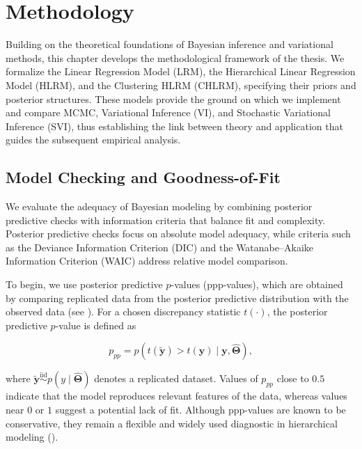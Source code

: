 \chapter{Methodology}

Building on the theoretical foundations of Bayesian inference and variational methods, this chapter develops the methodological framework of the thesis. We formalize the Linear Regression Model (LRM), the Hierarchical Linear Regression Model (HLRM), and the Clustering HLRM (CHLRM), specifying their priors and posterior structures. These models provide the ground on which we implement and compare MCMC, Variational Inference (VI), and Stochastic Variational Inference (SVI), thus establishing the link between theory and application that guides the subsequent empirical analysis.

\section{Model Checking and Goodness-of-Fit}

We evaluate the adequacy of Bayesian modeling by combining posterior predictive checks with information criteria that balance fit and complexity. Posterior predictive checks focus on absolute model adequacy, while criteria such as the Deviance Information Criterion (DIC) and the Watanabe–Akaike Information Criterion (WAIC) address relative model comparison.

\vspace{0.5cm}

To begin, we use posterior predictive $p$-values (ppp-values), which are obtained by comparing replicated data from the posterior predictive distribution with the observed data (see  \cite{GELMAN14}). For a chosen discrepancy statistic $t(\cdot)$, the posterior predictive $p$-value is defined as

\begin{equation}
p_{pp} = p\left(t(\bm{\tilde{y}}) > t(\bm y)\mid \bm y,\hat{\bm\Theta}\right),
\end{equation}

where $\bm{\tilde{y}} \stackrel{\text{iid}}{\sim} p(y \mid\hat{\bm\Theta})$ denotes a replicated dataset. Values of $p_{pp}$ close to $0.5$ indicate that the model reproduces relevant features of the data, whereas values near $0$ or $1$ suggest a potential lack of fit. Although ppp-values are known to be conservative, they remain a flexible and widely used diagnostic in hierarchical modeling (\cite{SOSA}).

